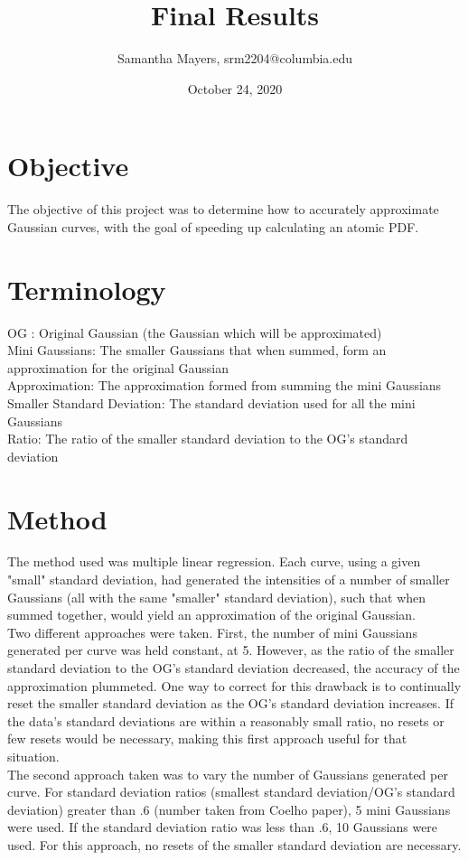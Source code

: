 \documentclass{article}
\title{Final Results}
\author{Samantha Mayers, srm2204@columbia.edu}%
\date{October 24, 2020} %
\begin{document}
\newpage
\section*{Objective}
The objective of this project was to determine how to accurately approximate Gaussian curves, with the goal of speeding up calculating an atomic PDF. \\

\section*{Terminology}
OG : Original Gaussian (the Gaussian which will be approximated) \\
Mini Gaussians: The smaller Gaussians that when summed, form an approximation for the original Gaussian \\ 
Approximation: The approximation formed from summing the mini Gaussians \\
Smaller Standard Deviation: The standard deviation used for all the mini Gaussians \\
Ratio: The ratio of the smaller standard deviation to the OG's standard deviation \\

\section*{Method}
The method used was multiple linear regression. Each curve, using a given "small" standard deviation, had generated the intensities of a number of smaller Gaussians (all with the same "smaller" standard deviation), such that when summed together, would yield an approximation of the original Gaussian. \\
\newline
Two different approaches were taken. First, the number of mini Gaussians generated per curve was held constant, at 5. However, as the ratio of the smaller standard deviation to the OG's standard deviation decreased, the accuracy of the approximation plummeted. One way to correct for this drawback is to continually reset the smaller standard deviation as the OG's standard deviation increases. If the data's standard deviations are within a reasonably small ratio, no resets or few resets would be necessary, making this first approach useful for that situation. \\
\newline
The second approach taken was to vary the number of Gaussians generated per curve. For standard deviation ratios (smallest standard deviation/OG's standard deviation) greater than .6 (number taken from Coelho paper), 5 mini Gaussians were used. If the standard deviation ratio was less than .6, 10 Gaussians were used. For this approach, no resets of the smaller standard deviation are necessary. \\
\end{document}
